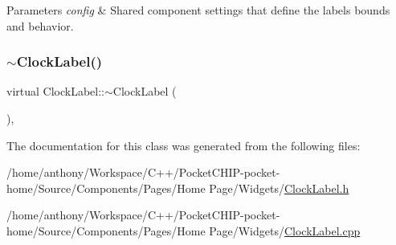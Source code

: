 \begin{DoxyParams}{Parameters}
{\em config} & Shared component settings that define the label\textquotesingle{}s bounds and behavior. \\
\hline
\end{DoxyParams}
\mbox{\label{classClockLabel_acb17321406fe48ca0cac19e06ba193b0}} 
\subsubsection{\texorpdfstring{$\sim$\+Clock\+Label()}{~ClockLabel()}}
{\footnotesize\ttfamily virtual Clock\+Label\+::$\sim$\+Clock\+Label (\begin{DoxyParamCaption}{ }\end{DoxyParamCaption})\hspace{0.3cm}{\ttfamily [inline]}, {\ttfamily [virtual]}}



The documentation for this class was generated from the following files\+:\begin{DoxyCompactItemize}
\item 
/home/anthony/\+Workspace/\+C++/\+Pocket\+C\+H\+I\+P-\/pocket-\/home/\+Source/\+Components/\+Pages/\+Home Page/\+Widgets/\mbox{\hyperlink{ClockLabel_8h}{Clock\+Label.\+h}}\item 
/home/anthony/\+Workspace/\+C++/\+Pocket\+C\+H\+I\+P-\/pocket-\/home/\+Source/\+Components/\+Pages/\+Home Page/\+Widgets/\mbox{\hyperlink{ClockLabel_8cpp}{Clock\+Label.\+cpp}}\end{DoxyCompactItemize}
